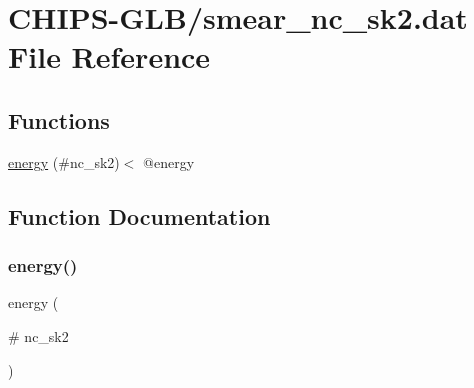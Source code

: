 \hypertarget{smear__nc__sk2_8dat}{}\section{C\+H\+I\+P\+S-\/\+G\+L\+B/smear\+\_\+nc\+\_\+sk2.dat File Reference}
\label{smear__nc__sk2_8dat}
\subsection*{Functions}
\begin{DoxyCompactItemize}
\item 
\hyperlink{smear__nc__sk2_8dat_a4171cdfce60df69f03aeb0fce958d8d8}{energy} (\#nc\+\_\+sk2)$<$ @energy
\end{DoxyCompactItemize}


\subsection{Function Documentation}
\mbox{\label{smear__nc__sk2_8dat_a4171cdfce60df69f03aeb0fce958d8d8}} 
\subsubsection{\texorpdfstring{energy()}{energy()}}
{\footnotesize\ttfamily energy (\begin{DoxyParamCaption}\item[{\#}]{nc\+\_\+sk2 }\end{DoxyParamCaption})}

